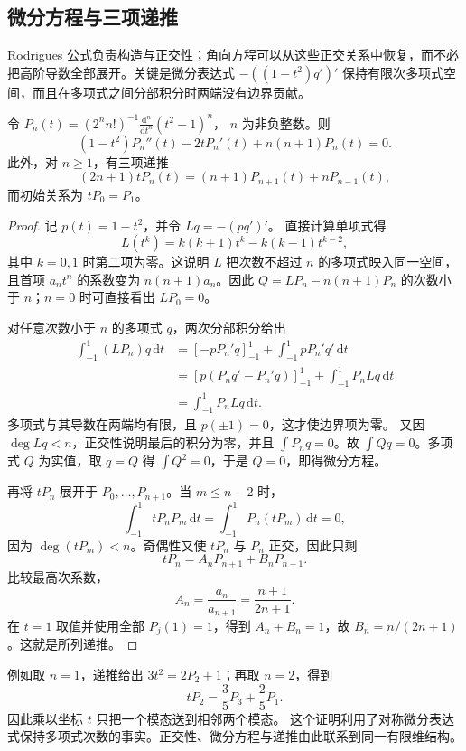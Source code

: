 \subsection{微分方程与三项递推}
\label{b2:subsec:B20202}

Rodrigues 公式负责构造与正交性；角向方程可以从这些正交关系中恢复，而不必把高阶导数全部展开。关键是微分表达式
\(-((1-t^2)q')'\) 保持有限次多项式空间，而且在多项式之间分部积分时两端没有边界贡献。

\begin{proposition}[Legendre 方程]
\label{b2:prop:B2-legendre-equation}
令
\(P_n(t)=(2^nn!)^{-1}\frac{\mathrm d^n}{\mathrm dt^n}(t^2-1)^n\)，
\(n\) 为非负整数。则
\[
 (1-t^2)P_n''(t)-2tP_n'(t)+n(n+1)P_n(t)=0.
\]
此外，对 \(n\ge1\)，有三项递推
\[
 (2n+1)tP_n(t)=(n+1)P_{n+1}(t)+nP_{n-1}(t),
\]
而初始关系为 \(tP_0=P_1\)。
\end{proposition}
\begin{proof}
记 \(p(t)=1-t^2\)，并令 \(Lq=-(pq')'\)。
直接计算单项式得
\[
 L(t^k)=k(k+1)t^k-k(k-1)t^{k-2},
\]
其中 \(k=0,1\) 时第二项为零。这说明 \(L\) 把次数不超过
\(n\) 的多项式映入同一空间，且首项 \(a_nt^n\) 的系数变为
\(n(n+1)a_n\)。因此
\(Q=LP_n-n(n+1)P_n\) 的次数小于 \(n\)；\(n=0\) 时可直接看出
\(LP_0=0\)。

对任意次数小于 \(n\) 的多项式 \(q\)，两次分部积分给出
\[
\begin{aligned}
 \int_{-1}^1(LP_n)q\,\mathrm dt
 &=[-pP_n'q]_{-1}^1+\int_{-1}^1pP_n'q'\,\mathrm dt\\
 &=[p(P_nq'-P_n'q)]_{-1}^1
       +\int_{-1}^1P_nLq\,\mathrm dt\\
 &=\int_{-1}^1P_nLq\,\mathrm dt.
\end{aligned}
\]
多项式与其导数在两端均有限，且 \(p(\pm1)=0\)，这才使边界项为零。
又因 \(\deg Lq<n\)，正交性说明最后的积分为零，并且
\(\int P_nq=0\)。故 \(\int Qq=0\)。多项式 \(Q\) 为实值，取
\(q=Q\) 得 \(\int Q^2=0\)，于是 \(Q=0\)，即得微分方程。

再将 \(tP_n\) 展开于 \(P_0,\ldots,P_{n+1}\)。当
\(m\le n-2\) 时，
\[
 \int_{-1}^1tP_nP_m\,\mathrm dt
 =\int_{-1}^1P_n(tP_m)\,\mathrm dt=0,
\]
因为 \(\deg(tP_m)<n\)。奇偶性又使 \(tP_n\) 与 \(P_n\) 正交，因此只剩
\[
 tP_n=A_nP_{n+1}+B_nP_{n-1}.
\]
比较最高次系数，
\[
 A_n=\frac{a_n}{a_{n+1}}=\frac{n+1}{2n+1}.
\]
在 \(t=1\) 取值并使用全部 \(P_j(1)=1\)，得到
\(A_n+B_n=1\)，故 \(B_n=n/(2n+1)\)。这就是所列递推。
\end{proof}

例如取 \(n=1\)，递推给出 \(3t^2=2P_2+1\)；再取 \(n=2\)，得到
\[
 tP_2=\frac35P_3+\frac25P_1.
\]
因此乘以坐标 \(t\) 只把一个模态送到相邻两个模态。
这个证明利用了对称微分表达式保持多项式次数的事实。正交性、微分方程与递推由此联系到同一有限维结构。

